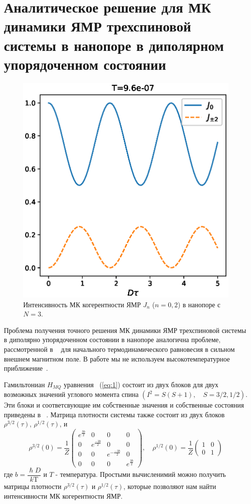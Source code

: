 \documentclass[review]{elsarticle}
\begin{document}
\section{Аналитическое решение для МК динамики ЯМР трехспиновой системы в нанопоре в диполярном упорядоченном состоянии}
\label{sec:3}

\begin{figure}
    \centering
  	\includegraphics[width=0.5\linewidth]{coherences_n3_beta5.eps}
	\caption{
	    Интенсивность МК когерентности ЯМР $J_{n}$ ($n=0, 2$) в нанопоре с $N=3$.
	}
	\label{fig:1}
\end{figure}

Проблема получения точного решения МК динамики ЯМР трехспиновой системы в диполярно упорядоченном состоянии в нанопоре аналогична проблеме, рассмотренной в ~\cite{Doronin_2019} для начального термодинамического равновесия в сильном внешнем магнитном поле.
В работе мы не используем высокотемпературное приближение~\cite{Goldman_1970}.

Гамильтониан $H_{MQ}$ уравнения ~(\ref{eq:1}) состоит из двух блоков для двух возможных значений углового момента спина $(I^2 = S(S+1),  \quad S=3/2,1/2)$.
Эти блоки и соответсвующие им собственные значения и собственные состояния приведены в ~\cite{Doronin_2019}.
Матрица плотности системы также состоит из двух блоков $\rho^{3/2}(\tau)$, $\rho^{1/2}(\tau)$, и
%
\begin{equation}
    \label{eq:15} 
    \rho^{3/2}(0) = \dfrac 1 Z
    \begin{pmatrix}
        e^{\frac{3b}{2}} & 0 & 0 & 0 
        \\
        0 & e^{\frac{-3b}{2}} & 0 & 0 
        \\
        0 & 0 & e^{-\frac{-3b}{2}} & 0 
        \\
        0 & 0 & 0 & e^{\frac{3b}{2}}
    \end{pmatrix}, 
    \quad
    \rho^{1/2}(0) = \dfrac 1 Z
    \begin{pmatrix}
       	1 & 0 
        \\
        0 & 1
    \end{pmatrix}
\end{equation}
%
где $b = \dfrac{\hslash D}{k\mathrm{T}}$ и $T$ - температура.
Простыми вычисленимий можно получить матрицы плотности $\rho^{3/2}(\tau)$ и $\rho^{1/2}(\tau)$,
которые позволяют нам найти интенсивности МК когерентности ЯМР.
\end{document}
